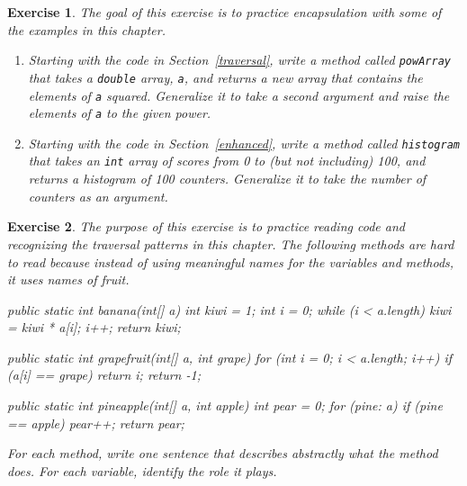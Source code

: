 \documentclass[12pt]{book}
\theoremstyle{exercise}
\newtheorem{exercise}{Exercise}[chapter]
\newcommand{\java}[1]{\verb"#1"}
\newcommand{\java}[1]{\lstinline{#1}} %
\begin{document}
\begin{exercise}
The goal of this exercise is to practice encapsulation with some of the examples in this chapter.

\begin{enumerate}

\item Starting with the code in Section~\ref{traversal}, write a method called \java{powArray} that takes a \java{double} array, \java{a}, and returns a new array that contains the elements of \java{a} squared.
Generalize it to take a second argument and raise the elements of \java{a} to the given power.

\item Starting with the code in Section~\ref{enhanced}, write a method called \java{histogram} that takes an \java{int} array of scores from 0 to (but not including) 100, and returns a histogram of 100 counters.
Generalize it to take the number of counters as an argument.

\end{enumerate}

\end{exercise}



\begin{exercise}
The purpose of this exercise is to practice reading code and recognizing the traversal patterns in this chapter.
The following methods are hard to read because instead of using meaningful names for the variables and methods, it uses names of fruit.

\begin{code}
    public static int banana(int[] a) {
        int kiwi = 1;
        int i = 0;
        while (i < a.length) {
            kiwi = kiwi * a[i];
            i++;
        }
        return kiwi;
    }
\end{code}

\begin{code}
    public static int grapefruit(int[] a, int grape) {
        for (int i = 0; i < a.length; i++) {
            if (a[i] == grape) {
                return i;
            }
        }
        return -1;
    }
\end{code}

\begin{code}
    public static int pineapple(int[] a, int apple) {
        int pear = 0;
        for (pine: a) {
            if (pine == apple) {
                pear++;
            }
        }
        return pear;
    }
\end{code}

For each method, write one sentence that describes abstractly what the method does.
For each variable, identify the role it plays.

\end{exercise}
\end{document}
